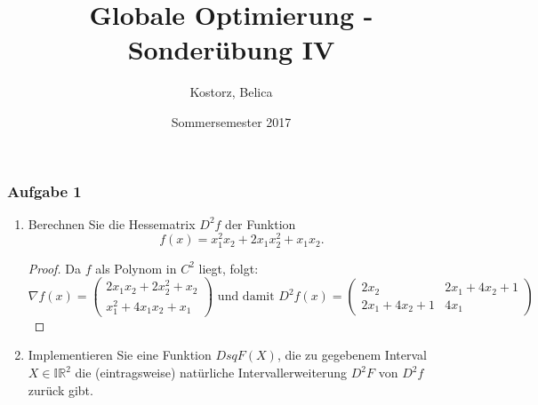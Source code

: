 \documentclass[12pt]{extreport} %
\title{Globale Optimierung - Sonderübung IV}
\author{Kostorz, Belica}
\date{Sommersemester 2017}
\begin{document}
\thispagestyle{empty}
\thispagestyle{firststyle}

\subsubsection*{Aufgabe 1}

\begin{enumerate}
	\item Berechnen Sie die Hessematrix $D^2f$ der Funktion
		$$ f(x) = x^2_1 x_2 + 2 x_1 x_2^2 + x_1 x_2. $$ 
		\begin{proof}
			Da $f$ als Polynom in $C^2$ liegt, folgt:
			$$ \nabla f(x) = \begin{pmatrix} 2 x_1 x_2 + 2 x_2^2 + x_2 \\ x_1^2 + 4 x_1 x_2 + x_1 \end{pmatrix} \text{ und damit } D^2 f(x) = \begin{pmatrix}
				2 x_2 & 2 x_1 + 4x_2 + 1 \\ 2 x_1 + 4x_2 + 1 & 4 x_1
			\end{pmatrix} $$
		\end{proof}
	\item Implementieren Sie eine Funktion $DsqF(X)$, die zu gegebenem Interval $X \in \mathbb{IR}^2$ die (eintragsweise) natürliche Intervallerweiterung $D^2F$ von $D^2f$ zurück gibt. \smallskip
	

\end{enumerate}
\end{document}
